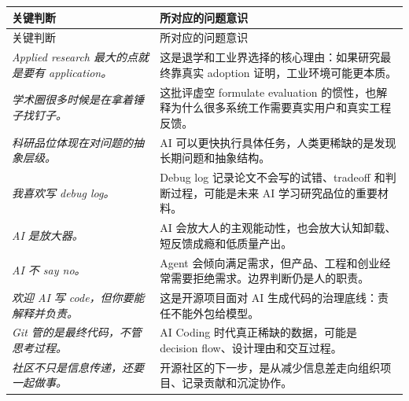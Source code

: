 \documentclass[a4paper]{article}
\begin{document}
\begin{longtable}{>{\raggedright\arraybackslash}p{} >{\raggedright\arraybackslash}p{}}
\toprule
关键判断 & 所对应的问题意识 \\
\midrule
\endfirsthead
\toprule
关键判断 & 所对应的问题意识 \\
\midrule
\endhead
\textit{Applied research 最大的点就是要有 application。} & 这是退学和工业界选择的核心理由：如果研究最终靠真实 adoption 证明，工业环境可能更本质。 \\
\textit{学术圈很多时候是在拿着锤子找钉子。} & 这批评虚空 formulate evaluation 的惯性，也解释为什么很多系统工作需要真实用户和真实工程反馈。 \\
\textit{科研品位体现在对问题的抽象层级。} & AI 可以更快执行具体任务，人类更稀缺的是发现长期问题和抽象结构。 \\
\textit{我喜欢写 debug log。} & Debug log 记录论文不会写的试错、tradeoff 和判断过程，可能是未来 AI 学习研究品位的重要材料。 \\
\textit{AI 是放大器。} & AI 会放大人的主观能动性，也会放大认知卸载、短反馈成瘾和低质量产出。 \\
\textit{AI 不 say no。} & Agent 会倾向满足需求，但产品、工程和创业经常需要拒绝需求。边界判断仍是人的职责。 \\
\textit{欢迎 AI 写 code，但你要能解释并负责。} & 这是开源项目面对 AI 生成代码的治理底线：责任不能外包给模型。 \\
\textit{Git 管的是最终代码，不管思考过程。} & AI Coding 时代真正稀缺的数据，可能是 decision flow、设计理由和交互过程。 \\
\textit{社区不只是信息传递，还要一起做事。} & 开源社区的下一步，是从减少信息差走向组织项目、记录贡献和沉淀协作。 \\
\bottomrule
\end{longtable}
\end{document}
